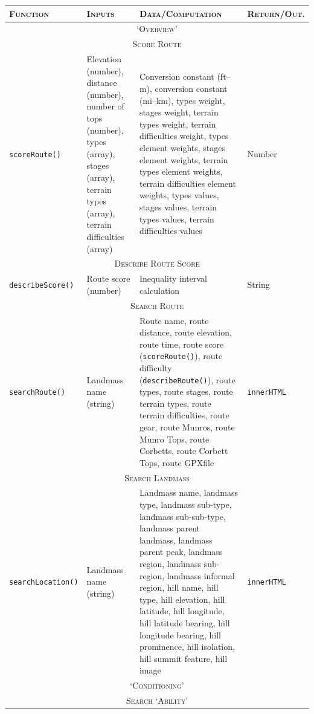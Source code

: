 \documentclass[11pt, english]{article}
\begin{document}
	\begin{center}
		\scriptsize
	\begin{longtable}{p{2.25cm}p{3.5cm}p{5cm}p{2cm}}
		\textsc{Function} & \textsc{Inputs} & \textsc{Data/Computation} & \textsc{Return/Out.}\\
		\hline
		\hline
		\multicolumn{4}{c}{\textsc{`Overview'}}\\
		\hline \hline
		\multicolumn{4}{c}{\textsc{Score Route}}\\
		\hline
		\texttt{scoreRoute()} & Elevation (number), distance (number), number of tops (number), types (array), stages (array), terrain types (array), terrain difficulties (array) & Conversion constant (ft--m), conversion constant (mi--km), types weight, stages weight, terrain types weight, terrain difficulties weight, types element weights, stages element weights, terrain types element weights, terrain difficulties element weights, types values, stages values, terrain types values, terrain difficulties values & Number\\
		\hline
		\multicolumn{4}{c}{\textsc{Describe Route Score}}\\
		\hline
		\texttt{describeScore()} & Route score (number) & Inequality interval calculation & String\\
		\hline
		\multicolumn{4}{c}{\textsc{Search Route}}\\
		\hline
		\texttt{searchRoute()} & Landmass name (string) & Route name, route distance, route elevation, route time, route score (\texttt{scoreRoute()}), route difficulty (\texttt{describeRoute()}), route types, route stages, route terrain types, route terrain difficulties, route gear, route Munros, route Munro Tops, route Corbetts, route Corbett Tops, route GPXfile & \texttt{innerHTML}\\
		\hline
		\multicolumn{4}{c}{\textsc{Search Landmass}}\\
		\hline
		\texttt{searchLocation()} & Landmass name (string) & Landmass name, landmass type, landmass sub-type, landmass sub-sub-type, landmass parent landmass, landmass parent peak, landmass region, landmass sub-region, landmass informal region, hill name, hill type, hill elevation, hill latitude, hill longitude, hill latitude bearing, hill longitude bearing, hill prominence, hill isolation, hill summit feature, hill image & \texttt{innerHTML}\\
		\hline
		\hline
		\multicolumn{4}{c}{\textsc{`Conditioning'}}\\
		\hline
		\hline
		\multicolumn{4}{c}{\textsc{Search `Ability'}}\\

\end{longtable}
\end{center}
\end{document}

